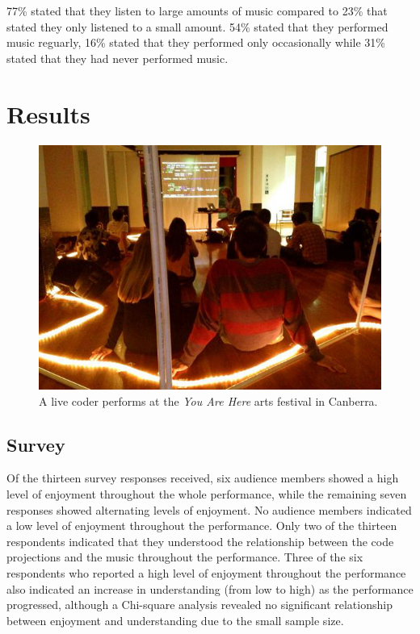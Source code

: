 77\% stated that they listen to large amounts of music compared to 23\% that stated they only listened to a small amount. 54\% stated that they performed music reguarly, 16\% stated that they performed only occasionally while 31\% stated that they had never performed music.

\section{Results}

\begin{figure}
\centering
\includegraphics[width=\textwidth]{../images/study-1-you-are-here.jpg}
\caption[\textit{You Are Here} live coding performance]{A live coder performs at the \textit{You Are Here} arts festival in Canberra.}
\label{fig:you-are-here-performance}
\end{figure}

\subsection{Survey}

Of the thirteen survey responses received, six audience members showed a high level of enjoyment throughout the whole performance, while the remaining seven responses showed alternating levels of enjoyment. No audience members indicated a low level of enjoyment throughout the performance.  Only two of the thirteen respondents indicated that they understood the relationship between the code projections and the music throughout the performance. Three of the six respondents who reported a high level of enjoyment throughout the performance also indicated an increase in understanding (from low to high) as the performance progressed, although a Chi-square analysis revealed no significant relationship between enjoyment and understanding due to the small sample size. 

